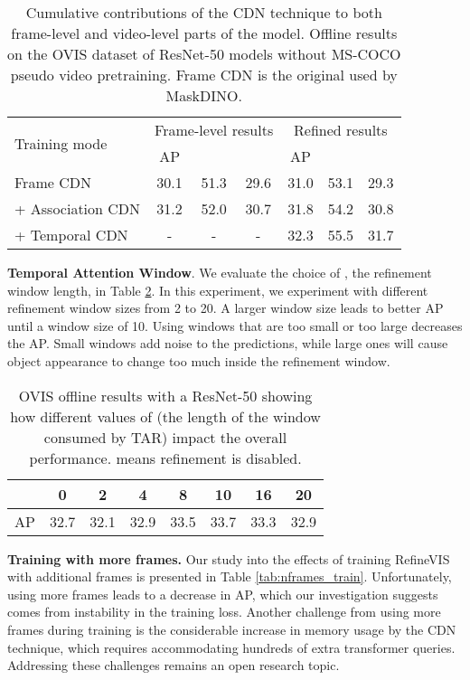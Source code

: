 \begin{table}
    \centering
    \footnotesize
    \setlength{\tabcolsep}{5pt}
    \begin{tabular}{l|ccc|ccc}
        \toprule
        \multirow{2}{*}{Training mode} & \multicolumn{3}{c|}{Frame-level results} & \multicolumn{3}{c}{Refined results} \\
        & AP &  &  & AP &  &  \\
		\midrule
        Frame CDN         & 30.1 & 51.3 & 29.6 & 31.0 & 53.1 & 29.3 \\
        + Association CDN & 31.2 & 52.0 & 30.7 & 31.8 & 54.2 & 30.8 \\
        + Temporal CDN    & -    & -    & -    & 32.3 & 55.5 & 31.7 \\
    \bottomrule
    \end{tabular}
    \caption{Cumulative contributions of the CDN technique to both frame-level and video-level parts of the model. Offline results on the OVIS dataset of ResNet-50 models without MS-COCO pseudo video pretraining. Frame CDN is the original used by MaskDINO.}
    \label{tab:ablation_denoising}
\end{table}


\textbf{Temporal Attention Window}. We evaluate the choice of , the refinement window length, in Table \ref{tab:ablation_attn_win}. 
In this experiment, we experiment with different refinement window sizes from 2 to 20. A larger window size leads to better AP until a window size of 10. Using windows that are too small or too large decreases the AP.
Small windows add noise to the predictions, while large ones will cause object appearance to change too much inside the refinement window.
  
\begin{table}
    \centering 
    \footnotesize 
    \begin{tabular}{c|c|cccccc} 
        \toprule 
         & 0 & 2 & 4 & 8 & 10 & 16 & 20 \\ 
        \midrule 
        AP & 32.7 & 32.1 & 32.9 & 33.5 & 33.7 & 33.3 & 32.9 \\ 
    \bottomrule 
    \end{tabular} 
    \caption{OVIS offline results with a ResNet-50 showing how different values of  (the length of the window consumed by TAR) impact the overall performance.  means refinement is disabled.} 
    \label{tab:ablation_attn_win} 
\end{table} 


\textbf{Training with more frames.} Our study into the effects of training RefineVIS with additional frames is presented in Table \ref{tab:nframes_train}.
Unfortunately, using more frames leads to a decrease in AP, which our investigation suggests comes from instability in the training loss.
Another challenge from using more frames during training is the considerable increase in memory usage by the CDN technique, which requires accommodating hundreds of extra transformer queries.
Addressing these challenges remains an open research topic.

